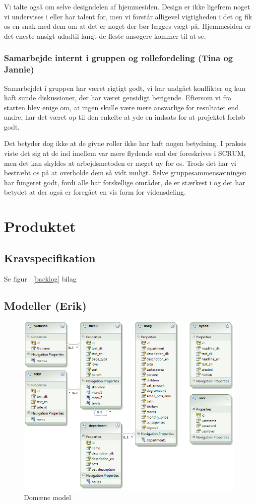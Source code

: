 \documentclass[12pt, a4paper]{report}
\begin{document}
Vi talte også om selve designdelen af hjemmesiden. Design er ikke ligefrem noget vi undervises i eller har talent for, men vi forstår alligevel vigtigheden i det og fik os en snak med dem om at det er noget der bør lægges vægt på. Hjemmesiden er det eneste ansigt udadtil langt de fleste ansøgere kommer til at se.

\subsection{Samarbejde internt i gruppen og rollefordeling (Tina og Jannie)}
Samarbejdet i gruppen har været rigtigt godt, vi har undgået konflikter og kun haft sunde diskussioner, der har været gensidigt berigende. Eftersom vi fra starten blev enige om, at ingen skulle være mere ansvarlige for resultatet end andre, har det været op til den enkelte at yde en indsats for at projektet forløb godt.

Det betyder dog ikke at de givne roller ikke har haft nogen betydning. I praksis viste det sig at de ind imellem var mere flydende end der foreskrives i SCRUM, men det kan skyldes at arbejdsmetoden er meget ny for os. Trods det har vi bestræbt os på at overholde dem så vidt muligt. Selve gruppesammensætningen har fungeret godt, fordi alle har forskellige områder, de er stærkest i og det har betydet at der også er foregået en vis form for vidensdeling.

\chapter{Produktet}
\section{Kravspecifikation}
Se figur ~\ref{backlog} bilag

\section{Modeller (Erik)}
\begin{figure}[ht]
\includegraphics[width=\textwidth]{model}
\caption{Domæne model}
\label{model}
\end{figure}
\end{document}
